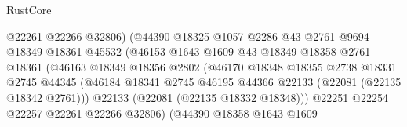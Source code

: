 \begin{lexlean}{RustCore}
\begin{coremodule}
                                        @22261
                                        @22266
                                        @32806)
                                      (@44390
                                        @18325
                                        @1057
                                        @2286
                                        @43
                                        @2761
                                        @9694
                                        @18349
                                        @18361
                                        @45532
                                        (@46153
                                          @1643
                                          @1609
                                          @43
                                          @18349
                                          @18358
                                          @2761
                                          @18361
                                          (@46163
                                            @18349
                                            @18356
                                            @2802
                                            (@46170
                                              @18348
                                              @18355
                                              @2738
                                              @18331
                                              @2745
                                              @44345
                                              (@46184
                                                @18341
                                                @2745
                                                @46195
                                                @44366
                                                @22133
                                                (@22081 (@22135 @18342 @2761)))
                                              @22133
                                              (@22081 (@22135 @18332 @18348)))
                                            @22251
                                            @22254
                                            @22257
                                            @22261
                                            @22266
                                            @32806)
                                          (@44390
                                            @18358
                                            @1643
                                            @1609

\end{coremodule}
\end{lexlean}
